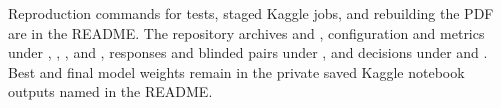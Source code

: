 Reproduction commands for tests, staged Kaggle jobs, and rebuilding the PDF are in the README. The repository archives  and , configuration and metrics under , , , and , responses and blinded pairs under , and decisions under  and . Best and final model weights remain in the private saved Kaggle notebook outputs named in the README.
